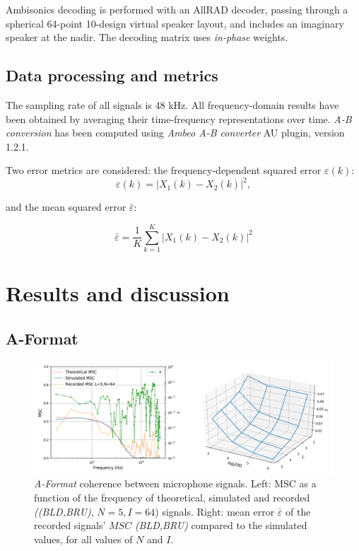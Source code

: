 Ambisonics decoding is performed with an AllRAD decoder, passing through a spherical 64-point 10-design virtual speaker layout, and includes an imaginary speaker at the nadir. The decoding matrix uses \textit{in-phase} weights.



\subsection{Data processing and metrics}

The sampling rate of all signals is 48 kHz.
All frequency-domain results have been obtained by averaging their time-frequency representations over time.  
\textit{A-B conversion} has been computed using \textit{Ambeo A-B converter} AU plugin, version 1.2.1.

Two error metrics are considered: the frequency-dependent squared error $\varepsilon(k)$:
\begin{equation}
	\varepsilon(k) = |X_1(k) - X_2(k)|^2,
	\label{eq:mse}
\end{equation}

 and the mean squared error $\bar{\varepsilon}$:

\begin{equation}
    \bar{\varepsilon} = \frac{1}{K}{\sum_{k=1}^{K} |X_1(k) - X_2(k)|^2}
    \label{eq:nmse}
\end{equation}



\section{Results and discussion}
\subsection{\label{subsec:results_aformat}A-Format}

\begin{figure}
	\includegraphics[width=\textwidth]{Figures/CoherenceEstimation/Figure1}
    \caption{\label{fig:Fig1}\textit{A-Format} coherence between microphone signals. Left: $\text{MSC}$ as a function of the frequency of theoretical, simulated and recorded \textit{((BLD,BRU)},  $N=5, I=64$) signals. Right: mean error $\bar{\varepsilon}$ of the recorded signals' $MSC$ \textit{(BLD,BRU)} compared to the simulated values, for all values of $N$ and $I$.}
\end{figure}


